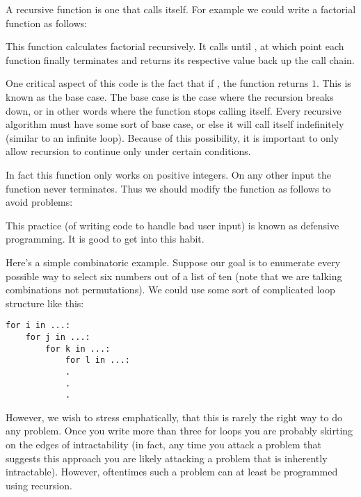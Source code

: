 

A recursive function is one that calls itself. For example we could write a factorial function as follows:



This function calculates factorial recursively. It calls  until , at which point each function finally terminates and returns its respective value back up the call chain.

One critical aspect of this code is the fact that if , the function returns $1$. This is known as the base case. The base case is the case where the recursion breaks down, or in other words where the function stops calling itself. Every recursive algorithm must have some sort of base case, or else it will call itself indefinitely (similar to an infinite loop).  Because of this possibility, it is important to only allow recursion to continue only under certain conditions.

In fact this function only works on positive integers. On any other input the function never terminates. Thus we should modify the function as follows to avoid problems:



This practice (of writing code to handle bad user input) is known as defensive programming. It is good to get into this habit.

Here's a simple combinatoric example. Suppose our goal is to enumerate every possible way to select six numbers out of a list of ten (note that we are talking combinations not permutations). We could use some sort of complicated  loop structure like this:

\begin{lstlisting}
for i in ...:
    for j in ...:
        for k in ...:
            for l in ...:
            .
            .
            .
\end{lstlisting}

However, we wish to stress emphatically, that this is rarely the right way to do any problem. Once you write more than three for loops you are probably skirting on the edges of intractability (in fact, any time you attack a problem that suggests this approach you are likely attacking a problem that is inherently intractable). However, oftentimes such a problem can at least be programmed using recursion.

